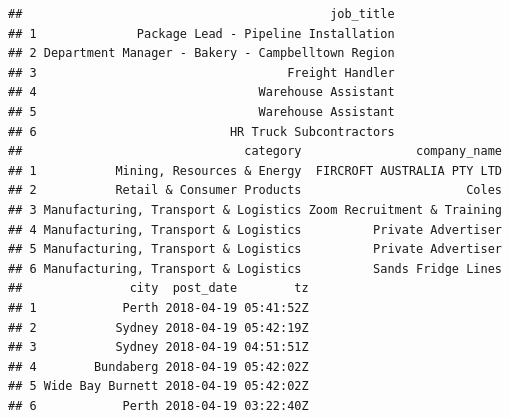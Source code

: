 \documentclass[11pt,a4paper,]{article}
\begin{document}
\begin{verbatim}
##                                           job_title
## 1              Package Lead - Pipeline Installation
## 2 Department Manager - Bakery - Campbelltown Region
## 3                                   Freight Handler
## 4                               Warehouse Assistant
## 5                               Warehouse Assistant
## 6                           HR Truck Subcontractors
##                               category                company_name
## 1           Mining, Resources & Energy  FIRCROFT AUSTRALIA PTY LTD
## 2           Retail & Consumer Products                       Coles
## 3 Manufacturing, Transport & Logistics Zoom Recruitment & Training
## 4 Manufacturing, Transport & Logistics          Private Advertiser
## 5 Manufacturing, Transport & Logistics          Private Advertiser
## 6 Manufacturing, Transport & Logistics          Sands Fridge Lines
##               city  post_date        tz
## 1            Perth 2018-04-19 05:41:52Z
## 2           Sydney 2018-04-19 05:42:19Z
## 3           Sydney 2018-04-19 04:51:51Z
## 4        Bundaberg 2018-04-19 05:42:02Z
## 5 Wide Bay Burnett 2018-04-19 05:42:02Z
## 6            Perth 2018-04-19 03:22:40Z

\end{verbatim}
\end{document}
